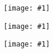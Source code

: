 \documentclass{article}
\newcommand{\addimage}[1]{
	\begin{figure}[h]
		\texttt{[image: \#1]} 
	\end{figure}
	\newpage
}
\begin{document}
	\addimage{a.png} 
	\addimage{b.png} 
	\addimage{c.png} 
\end{document}
